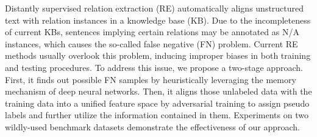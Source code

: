 Distantly supervised relation extraction (RE) automatically aligns unstructured text with relation instances in a knowledge base (KB). Due to the incompleteness of current KBs, sentences implying certain relations may be annotated as N/A instances, which causes the so-called false negative (FN) problem. Current RE methods usually overlook this problem, inducing improper biases in both training and testing procedures. To address this issue, we propose a two-stage approach. First, it finds out possible FN samples by heuristically leveraging the memory mechanism of deep neural networks. Then, it aligns those unlabeled data with the training data into a unified feature space by adversarial training to assign pseudo labels and further utilize the information contained in them. Experiments on two wildly-used benchmark datasets demonstrate the effectiveness of our approach.
